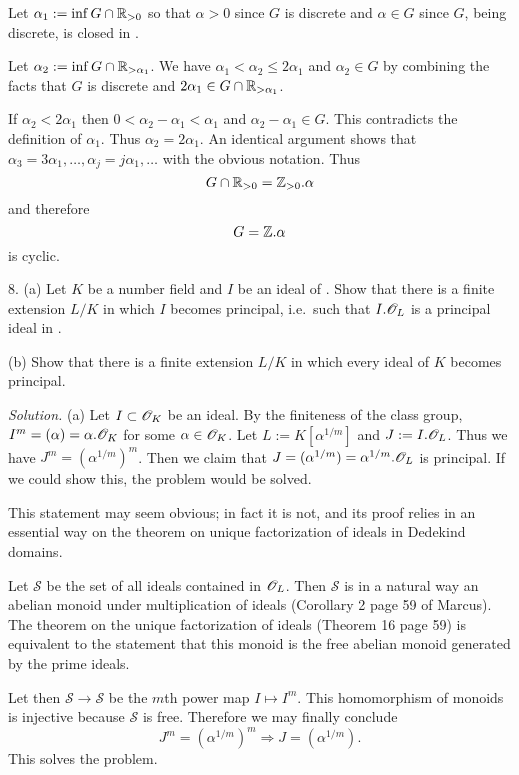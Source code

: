 \documentclass[10pt,a4paper,reqno]{amsart}
\begin{document}
Let $\alpha_1 := \inf G\cap \mathbb{R}_{> 0}$ so that $\alpha > 0$ since $G$ is
discrete and $\alpha\in G$ since $G$, being discrete, is closed in \R{}.

Let $\alpha_2 := \inf G\cap \mathbb{R}_{> \alpha_1}$. We have $\alpha_1 < \alpha_2 \le
2\alpha_1$ and $\alpha_2 \in G$ by combining the facts that $G$ is discrete and
$2\alpha_1 \in G\cap \mathbb{R}_{> \alpha_1}$.

If $\alpha_2 < 2\alpha_1$ then $0 < \alpha_2 - \alpha_1 < \alpha_1$ and
$\alpha_2 -\alpha_1 \in G$. This contradicts the definition of $\alpha_1$. Thus
$\alpha_2 = 2\alpha_1$. An identical argument shows that $\alpha_3 =
3\alpha_1,\dots, \alpha_j = j\alpha_1 , \dots$ with the obvious notation. Thus
\[G\cap \mathbb{R}_{>0} = \mathbb{Z}_{>0}.\alpha\] and therefore \[G = \mathbb{Z}.\alpha\] is cyclic.

\bigskip

8. (a) Let $K$ be a number field and $I$ be an ideal of \OK{}. Show that there
is a finite extension $L/K$ in which $I$ becomes principal, i.e.~such that
$I.\mathscr{O}_L$ is a principal ideal in \OL.

(b) Show that there is a finite extension $L/K$ in which every ideal of $K$
becomes principal.

\bigskip

\emph{Solution.} (a) Let $I \subset \mathscr{O}_K$ be an ideal. By the finiteness of the
class group, $I^m = (\alpha) = \alpha.\mathscr{O}_K$ for some $\alpha \in \mathscr{O}_K$. Let $L :=
K[\alpha^{1/m}]$ and $J := I.\mathscr{O}_L$. Thus we have $J^m = (\alpha^{1/m})^m$. Then
we claim that $J = (\alpha^{1/m}) = \alpha^{1/m}.\mathscr{O}_L$ is principal. If we could
show this, the problem would be solved.

This statement may seem obvious; in fact it is not, and its proof relies in an
essential way on the theorem on unique factorization of ideals in Dedekind
domains.

Let $\mathscr{S}$ be the set of all ideals contained in $\mathscr{O}_L$. Then
$\mathscr{S}$ is in a natural way an abelian monoid under multiplication of
ideals (Corollary 2 page 59 of Marcus). The theorem on the unique factorization
of ideals (Theorem 16 page 59) is equivalent to the statement that this monoid
is the free abelian monoid generated by the prime ideals.

Let then $\mathscr{S} \rightarrow \mathscr{S}$ be the $m$th power map $I
\mapsto I^m$. This homomorphism of monoids is injective because $\mathscr{S}$
is free. Therefore we may finally conclude \[ J^m = (\alpha^{1/m})^m
\Rightarrow J = (\alpha^{1/m}).\] This solves the problem.
\end{document}
